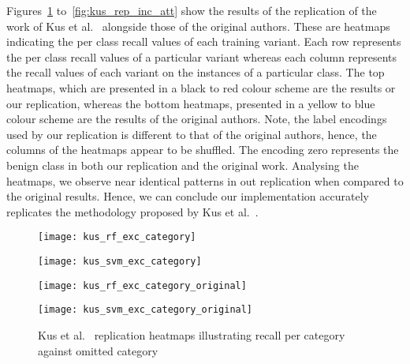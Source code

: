Figures~\ref{fig:kus_rep_exc_cat} to~\ref{fig:kus_rep_inc_att} show the results
of the replication of the work of Kus et al.~\cite{Kus} alongside those of the
original authors. These are heatmaps indicating the per class recall values of
each training variant. Each row represents the per class recall values of a
particular variant whereas each column represents the recall values of each
variant on the instances of a particular class. The top heatmaps, which are
presented in a black to red colour scheme are the results or our replication,
whereas the bottom heatmaps, presented in a yellow to blue colour scheme are
the results of the original authors. Note, the label encodings used by our
replication is different to that of the original authors, hence, the columns of
the heatmaps appear to be shuffled. The encoding zero represents the benign
class in both our replication and the original work. Analysing the heatmaps, we
observe near identical patterns in out replication when compared to the
original results. Hence, we can conclude our implementation accurately
replicates the methodology proposed by Kus et al.~\cite{Kus}.
%
\begin{figure}[htbp]
    \centering
    \begin{minipage}[h]{0.5\textwidth}
        \centering
        \texttt{[image: kus\_rf\_exc\_category]}
    \end{minipage}\hfill
    \begin{minipage}[h]{0.5\textwidth}
        \centering
        \texttt{[image: kus\_svm\_exc\_category]}
    \end{minipage}
    \begin{minipage}[h]{0.5\textwidth}
        \centering
        \texttt{[image: kus\_rf\_exc\_category\_original]}
    \end{minipage}\hfill
    \begin{minipage}[h]{0.5\textwidth}
        \centering
        \texttt{[image: kus\_svm\_exc\_category\_original]}
    \end{minipage}
    \caption[Kus et al.~\cite{Kus} Replication Category Omission Heatmaps]{Kus et al.~\cite{Kus} replication heatmaps illustrating recall per category against omitted category\label{fig:kus_rep_exc_cat}}
\end{figure}

